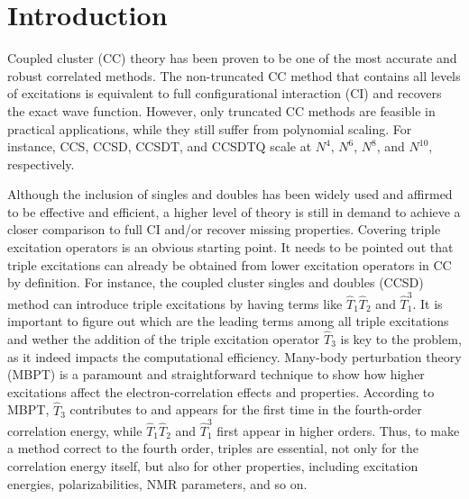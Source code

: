 \section{Introduction} \label{ch4-intro}
Coupled cluster (CC) theory\cite{Purvis1982, Crawford2000} has been proven to be one of the most accurate and robust correlated methods. The non-truncated CC method that contains all levels of excitations is equivalent to full configurational interaction (CI)\cite{Sherrill1999} and recovers the exact wave function. However, only truncated CC methods are feasible in practical applications, while they still suffer from polynomial scaling. For instance, CCS, CCSD,\cite{Purvis1982} CCSDT,\cite{Noga1987, Scuseria1988} and CCSDTQ\cite{Kucharski1998} scale at $N^{4}$, $N^{6}$, $N^{8}$, and $N^{10}$, respectively. 

Although the inclusion of singles and doubles has been widely used and affirmed to be effective and efficient, a higher level of theory is still in demand to achieve a closer comparison to full CI and/or recover missing properties. Covering triple excitation operators is an obvious starting point. It needs to be pointed out that triple excitations can already be obtained from lower excitation operators in CC by definition. For instance, the coupled cluster singles and doubles (CCSD) method can introduce triple excitations by having terms like $\hat{T}_{1}\hat{T}_{2}$ and $\hat{T}_{1}^{3}$. It is important to figure out which are the leading terms among all triple excitations and wether the addition of the triple excitation operator $\hat{T}_{3}$ is key to the problem, as it indeed impacts the computational efficiency. Many-body perturbation theory (MBPT)\cite{Bartlett1981} is a paramount and straightforward technique to show how higher excitations affect the electron-correlation effects and properties. According to MBPT, $\hat{T}_{3}$ contributes to and appears for the first time in the fourth-order correlation energy, while $\hat{T}_{1}\hat{T}_{2}$ and $\hat{T}_{1}^{3}$ first appear in higher orders. Thus, to make a method correct to the fourth order, triples are essential, not only for the correlation energy itself,\cite{Lee1984} but also for other properties, including excitation energies,\cite{Christiansen1995CC3, Watts1995, Christiansen1996, Kucharski2001} polarizabilities,\cite{Christiansen1998triple, Hald2003} NMR parameters,\cite{Gauss1996, Faber2017, Jaszunski2020} and so on.

